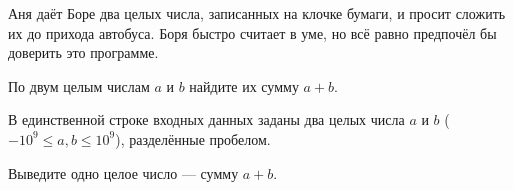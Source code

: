 Аня даёт Боре два целых числа, записанных на клочке бумаги, и просит сложить
их до прихода автобуса. Боря быстро считает в уме, но всё равно предпочёл бы
доверить это программе.

По двум целым числам $a$ и $b$ найдите их сумму $a + b$.

\InputFile

В единственной строке входных данных заданы два целых числа $a$ и $b$
($-10^9 \le a, b \le 10^9$), разделённые пробелом.

\OutputFile

Выведите одно целое число — сумму $a + b$.
